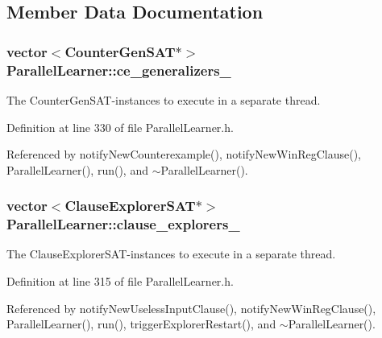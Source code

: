 \subsection{Member Data Documentation}
\hypertarget{classParallelLearner_a46cc16764d7ea8ffafe8d1b696c35df3}{
\subsubsection[{ce\-\_\-generalizers\-\_\-}]{\setlength{\rightskip}{0pt plus 5cm}vector$<${\bf Counter\-Gen\-S\-A\-T}$\ast$$>$ Parallel\-Learner\-::ce\-\_\-generalizers\-\_\-\hspace{0.3cm}{\ttfamily [protected]}}}\label{classParallelLearner_a46cc16764d7ea8ffafe8d1b696c35df3}


The Counter\-Gen\-S\-A\-T-\/instances to execute in a separate thread. 



Definition at line 330 of file Parallel\-Learner.\-h.



Referenced by notify\-New\-Counterexample(), notify\-New\-Win\-Reg\-Clause(), Parallel\-Learner(), run(), and $\sim$\-Parallel\-Learner().

\hypertarget{classParallelLearner_a0e8b5dd12c8ae14089d3ce3117da3c16}{
\subsubsection[{clause\-\_\-explorers\-\_\-}]{\setlength{\rightskip}{0pt plus 5cm}vector$<${\bf Clause\-Explorer\-S\-A\-T}$\ast$$>$ Parallel\-Learner\-::clause\-\_\-explorers\-\_\-\hspace{0.3cm}{\ttfamily [protected]}}}\label{classParallelLearner_a0e8b5dd12c8ae14089d3ce3117da3c16}


The Clause\-Explorer\-S\-A\-T-\/instances to execute in a separate thread. 



Definition at line 315 of file Parallel\-Learner.\-h.



Referenced by notify\-New\-Useless\-Input\-Clause(), notify\-New\-Win\-Reg\-Clause(), Parallel\-Learner(), run(), trigger\-Explorer\-Restart(), and $\sim$\-Parallel\-Learner().

